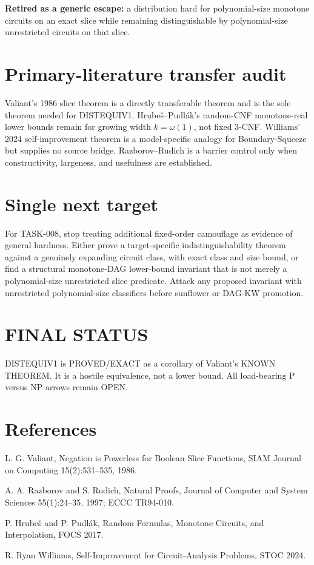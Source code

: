 \documentclass[11pt]{article}
\begin{document}
\textbf{Retired as a generic escape:} a distribution hard for polynomial-size monotone circuits on an exact slice while remaining distinguishable by polynomial-size unrestricted circuits on that slice.

\section*{Primary-literature transfer audit}
Valiant's 1986 slice theorem is a directly transferable theorem and is the sole theorem needed for DISTEQUIV1. Hrube\v{s}--Pudl\'ak's random-CNF monotone-real lower bounds remain for growing width \(k=\omega(1)\), not fixed 3-CNF. Williams' 2024 self-improvement theorem is a model-specific analogy for Boundary-Squeeze but supplies no source bridge. Razborov--Rudich is a barrier control only when constructivity, largeness, and usefulness are established.

\section*{Single next target}
For TASK-008, stop treating additional fixed-order camouflage as evidence of general hardness. Either prove a target-specific indistinguishability theorem against a genuinely expanding circuit class, with exact class and size bound, or find a structural monotone-DAG lower-bound invariant that is not merely a polynomial-size unrestricted slice predicate. Attack any proposed invariant with unrestricted polynomial-size classifiers before sunflower or DAG-KW promotion.

\section*{FINAL STATUS}
DISTEQUIV1 is PROVED/EXACT as a corollary of Valiant's KNOWN THEOREM. It is a hostile equivalence, not a lower bound. All load-bearing P versus NP arrows remain OPEN.

\section*{References}
L. G. Valiant, Negation is Powerless for Boolean Slice Functions, SIAM Journal on Computing 15(2):531--535, 1986.

A. A. Razborov and S. Rudich, Natural Proofs, Journal of Computer and System Sciences 55(1):24--35, 1997; ECCC TR94-010.

P. Hrube\v{s} and P. Pudl\'ak, Random Formulas, Monotone Circuits, and Interpolation, FOCS 2017.

R. Ryan Williams, Self-Improvement for Circuit-Analysis Problems, STOC 2024.

\end{document}
